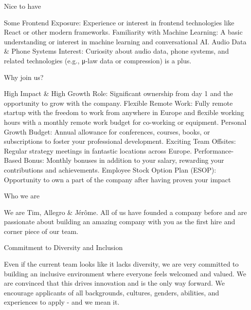 Nice to have

Some Frontend Exposure: Experience or interest in frontend technologies like React or other modern frameworks.
Familiarity with Machine Learning: A basic understanding or interest in machine learning and conversational AI.
Audio Data & Phone Systems Interest: Curiosity about audio data, phone systems, and related technologies (e.g., μ-law data or compression) is a plus.


Why join us?

High Impact & High Growth Role: Significant ownership from day 1 and the opportunity to grow with the company.
Flexible Remote Work: Fully remote startup with the freedom to work from anywhere in Europe and flexible working hours with a monthly remote work budget for co-working or equipment.
Personal Growth Budget: Annual allowance for conferences, courses, books, or subscriptions to foster your professional development.
Exciting Team Offsites: Regular strategy meetings in fantastic locations across Europe.
Performance-Based Bonus: Monthly bonuses in addition to your salary, rewarding your contributions and achievements.
Employee Stock Option Plan (ESOP): Opportunity to own a part of the company after having proven your impact


Who we are

We are Tim, Allegro & Jérôme. All of us have founded a company before and are passionate about building an amazing company with you as the first hire and corner piece of our team.

Commitment to Diversity and Inclusion

Even if the current team looks like it lacks diversity, we are very committed to building an inclusive environment where everyone feels welcomed and valued. We are convinced that this drives innovation and is the only way forward. We encourage applicants of all backgrounds, cultures, genders, abilities, and experiences to apply - and we mean it.


